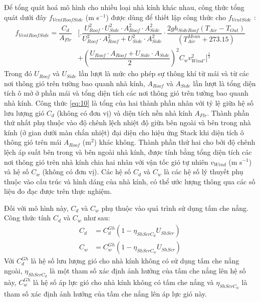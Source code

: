\documentclass[a4paper]{article}
\begin{document}
Để tổng quát hoá mô hình cho nhiều loại nhà kính khác nhau, công thức tổng quát dưới đây $f_{VentRoofSide}$ (m s$^{-1}$) được dùng để thiết lập công thức cho $f_{VentSide}$ \cite{kittas1996wind}:
\begin{equation}\label{eq:10}
\begin{aligned}
    f_{VentRoofSide} = \dfrac{C_d}{A_{Flr}} 
    &\Bigg[ \Bigg. \dfrac{U^2_{Roof} \cdot U^2_{Side} \cdot A^2_{Roof} \cdot A^2_{Side}}{U^2_{Roof} \cdot A^2_{Roof}+U^2_{Side}\cdot A^2_{Side}} \cdot \dfrac{2gh_{SideRoof}(T_{Air} - T_{Out})}{(T^{Mean}_{Air} + 273.15)}  \\
    &+ \left( \dfrac{U_{Roof}\cdot A_{Roof} + U_{Side}\cdot A_{Side}}{2}\right)^2 C_w v^2_{Wind} \Bigg. \Bigg] ^ {\frac{1}{2}}
\end{aligned}
\end{equation}
Trong đó $U_{Roof}$ và $U_{Side}$ lần lượt là mức cho phép sự thông khí từ mái và từ các nơi thông gió trên tường bao quanh nhà kính, $A_{Roof}$ và $A_{Side}$ lần lượt là tổng diện tích ô mở ở phần mái và tổng diện tích các nơi thông gió trên tường bao quanh nhà kính. Công thức \eqref{eq:10} là tổng của hai thành phần nhân với tỷ lệ giữa hệ số lưu lượng gió $C_d$ (không có đơn vị) và diện tích nền nhà kính $A_{Flr}$. Thành phần thứ nhất phụ thuộc vào độ chênh lệch nhiệt độ giữa bên ngoài và bên trong nhà kính (ở gian dưới màn chắn nhiệt) đại diện cho hiệu ứng Stack khi diện tích ô thông gió trên mái $A_{Roof}$ (m$^2$) khác không. Thành phần thứ hai cho bởi độ chênh lệch áp suất bên trong và bên ngoài nhà kính, được tính bằng tổng diện tích các nơi thông gió trên nhà kính chia hai nhân với vận tốc gió tự nhiên $v_{Wind}$ (m s$^{-1}$) và hệ số $C_w$ (không có đơn vị). Các hệ số $C_d$ và $C_w$ là các hệ số lý thuyết phụ thuộc vào cấu trúc và hình dáng của nhà kính, có thể ước lượng thông qua các số liệu đo đạc được trên thực nghiệm.
\par
Đối với mô hình này, $C_d$ và $C_w$ phụ thuộc vào quá trình sử dụng tấm che nắng. Công thức tính $C_d$ và $C_w$ như sau:
\begin{equation}
    \begin{aligned}
        C_d &= C^{Gh}_{d}(1 - \eta_{ShScrC_d}U_{ShScr}) \\
        C_w &= C^{Gh}_{w}(1 - \eta_{ShScrC_w}U_{ShScr})
    \end{aligned}
\end{equation}
Với $C^{Gh}_d$ là hệ số lưu lượng gió cho nhà kính không có sử dụng tấm che nắng ngoài, $\eta_{ShScrC_d}$ là một tham số xác định ảnh hưởng của tấm che nắng lên hệ số này, $C^{Gh}_w$ là hệ số áp lực gió cho nhà kính không có tấm che nắng và $\eta_{ShScrC_w}$ là tham số xác định ảnh hưởng của tấm che nắng lên áp lực gió này.
\end{document}
